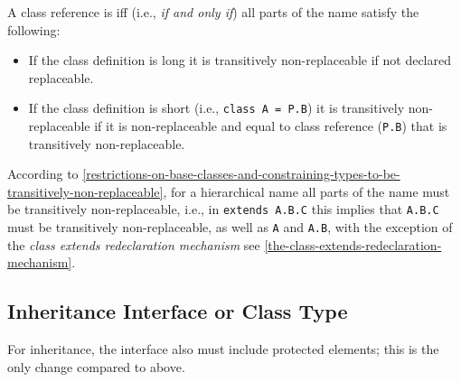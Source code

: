 A class reference is  iff (i.e., \emph{if and only if}) all parts of the name satisfy the following:
\begin{itemize}
\item
  If the class definition is long it is transitively non-replaceable if not declared replaceable.
\item
  If the class definition is short (i.e., \lstinline!class A = P.B!) it is transitively non-replaceable if it is non-replaceable and equal to class reference (\lstinline!P.B!) that is transitively non-replaceable.
\end{itemize}

\begin{nonnormative}
According to \cref{restrictions-on-base-classes-and-constraining-types-to-be-transitively-non-replaceable}, for a hierarchical name all parts of the name must be transitively non-replaceable, i.e., in \lstinline!extends A.B.C! this implies that \lstinline!A.B.C! must be transitively non-replaceable, as well as \lstinline!A! and \lstinline!A.B!, with the exception of the \emph{class extends redeclaration mechanism} see \cref{the-class-extends-redeclaration-mechanism}.
\end{nonnormative}

\subsection{Inheritance Interface or Class Type}\label{inheritance-interface-or-class-type}

For inheritance, the interface also must include protected elements; this is the only change compared to above.

